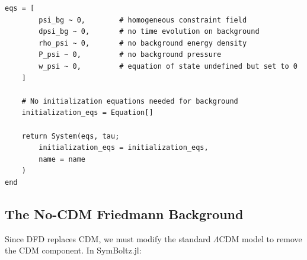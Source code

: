 \documentclass[11pt,a4paper]{article}
\begin{document}
\begin{lstlisting}[caption={DFD background component for SymBoltz.jl},label={lst:bg}]
    eqs = [
        psi_bg ~ 0,        # homogeneous constraint field
        dpsi_bg ~ 0,       # no time evolution on background
        rho_psi ~ 0,       # no background energy density
        P_psi ~ 0,         # no background pressure
        w_psi ~ 0,         # equation of state undefined but set to 0
    ]

    # No initialization equations needed for background
    initialization_eqs = Equation[]

    return System(eqs, tau;
        initialization_eqs = initialization_eqs,
        name = name
    )
end
\end{lstlisting}

\subsection{The No-CDM Friedmann Background}

Since DFD replaces CDM, we must modify the standard $\Lambda$CDM model to remove the CDM component. In SymBoltz.jl:
\end{document}

